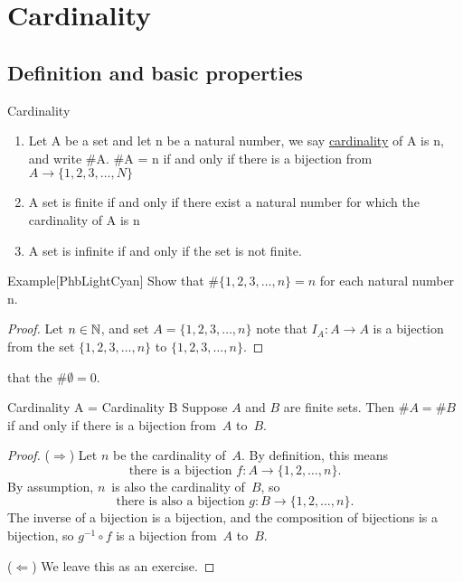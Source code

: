 \documentclass[../MATH-2000-Notes.tex]{subfiles}
\begin{document}
\chapter{Cardinality}
\section{Definition and basic properties}
\begin{Definition}
    {Cardinality}
    \begin{enumerate}
        \item Let A be a set and let n be a natural number, we say \underline{cardinality} of A is n, and write \#A. \#A = n if and only if there is a bijection from \(A \rightarrow \{1,2,3,\dots,N\}\)
        \item A set is finite if and only if there exist a natural number for which the cardinality of A is n
        \item A set is infinite if and only if the set is not finite.
    \end{enumerate}
\end{Definition}
\begin{commentbox}{Example}[{PhbLightCyan}]
    Show that \(\# \{1,2,3,\dots,n\} = n\) for each natural number n.
\end{commentbox}
\begin{proof}
    Let \(n\in \mathbb{N}\), and set \(A = \{1,2,3,\dots,n\}\) note that \(I_A: A \rightarrow A\) is a bijection from the set \(\{1,2,3,\dots,n\}\) to \(\{1,2,3,\dots,n\}\).
\end{proof}
\begin{Note}
    that the \(\# \emptyset = 0\).
\end{Note}
\begin{Proposition}
    {Cardinality A = Cardinality B}
    \label{CardA=CardBbijection}
    Suppose $A$ and $B$ are finite sets.
    Then $\#A = \#B$ if and only if there is a bijection from~$A$ to~$B$.
\end{Proposition}

\begin{proof}
    ($\Rightarrow$) Let $n$ be the cardinality of~$A$. By definition, this means
    $$ \text{there is a bijection $f \colon A \to \{1,2,\ldots,n\}$} .$$
    By assumption, $n$~is also the cardinality of~$B$, so
    $$ \text{there is also a bijection $g \colon B \to  \{1,2,\ldots,n\} $} .$$
    The inverse of a bijection is a bijection, and the composition of bijections is a bijection, so $g^{-1} \circ f$ is a bijection from~$A$ to~$B$.

    \smallskip

    ($\Leftarrow$) We leave this as an exercise.
\end{proof}
\end{document}
